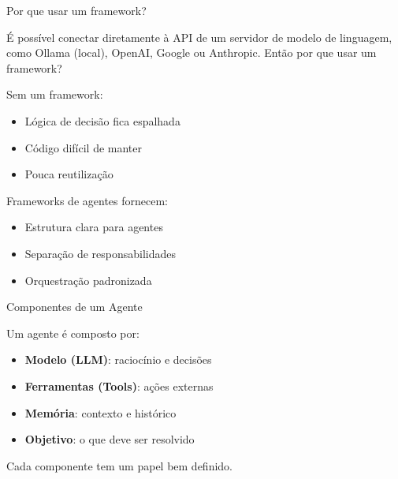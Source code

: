 \documentclass{beamer}
\begin{document}
\begin{frame}{Por que usar um framework?}
    
    É possível conectar diretamente à API de um servidor de modelo de linguagem, como Ollama (local), OpenAI, Google ou Anthropic. Então por que usar um framework?
    \pause

    Sem um framework:
    \begin{itemize}
        \item Lógica de decisão fica espalhada
        \item Código difícil de manter
        \item Pouca reutilização
    \end{itemize}
    
    \vspace{0.3cm}
    
    Frameworks de agentes fornecem:
    \begin{itemize}
        \item Estrutura clara para agentes
        \item Separação de responsabilidades
        \item Orquestração padronizada
    \end{itemize}
    
\end{frame}

\begin{frame}{Componentes de um Agente}
    
    Um agente é composto por:
    \begin{itemize}
        \item \textbf{Modelo (LLM)}: raciocínio e decisões
        \item \textbf{Ferramentas (Tools)}: ações externas
        \item \textbf{Memória}: contexto e histórico
        \item \textbf{Objetivo}: o que deve ser resolvido
    \end{itemize}
    
    \vspace{0.3cm}
    
    Cada componente tem um papel bem definido.
    
\end{frame}
\end{document}
